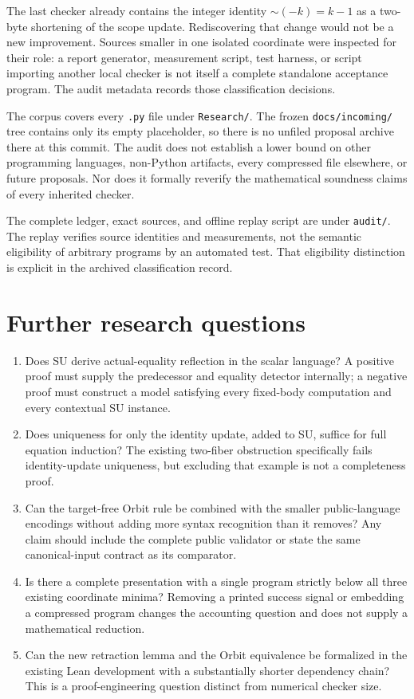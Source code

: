 \documentclass[11pt]{article}
\theoremstyle{definition}
\newcommand{\file}[1]{{\small\nolinkurl{#1}}}
\begin{document}
The last checker already contains the integer identity $\mathord{\sim}(-k)=k-1$ as a two-byte shortening of the scope update. Rediscovering that change would not be a new improvement. Sources smaller in one isolated coordinate were inspected for their role: a report generator, measurement script, test harness, or script importing another local checker is not itself a complete standalone acceptance program. The audit metadata records those classification decisions.

The corpus covers every \texttt{.py} file under \file{Research/}. The frozen \file{docs/incoming/} tree contains only its empty placeholder, so there is no unfiled proposal archive there at this commit. The audit does not establish a lower bound on other programming languages, non-Python artifacts, every compressed file elsewhere, or future proposals. Nor does it formally reverify the mathematical soundness claims of every inherited checker.

The complete ledger, exact sources, and offline replay script are under \file{audit/}. The replay verifies source identities and measurements, not the semantic eligibility of arbitrary programs by an automated test. That eligibility distinction is explicit in the archived classification record.

\section{Further research questions}

\begin{enumerate}
\item Does SU derive actual-equality reflection in the scalar language? A positive proof must supply the predecessor and equality detector internally; a negative proof must construct a model satisfying every fixed-body computation and every contextual SU instance.
\item Does uniqueness for only the identity update, added to SU, suffice for full equation induction? The existing two-fiber obstruction specifically fails identity-update uniqueness, but excluding that example is not a completeness proof.
\item Can the target-free Orbit rule be combined with the smaller public-language encodings without adding more syntax recognition than it removes? Any claim should include the complete public validator or state the same canonical-input contract as its comparator.
\item Is there a complete presentation with a single program strictly below all three existing coordinate minima? Removing a printed success signal or embedding a compressed program changes the accounting question and does not supply a mathematical reduction.
\item Can the new retraction lemma and the Orbit equivalence be formalized in the existing Lean development with a substantially shorter dependency chain? This is a proof-engineering question distinct from numerical checker size.
\end{enumerate}
\end{document}
